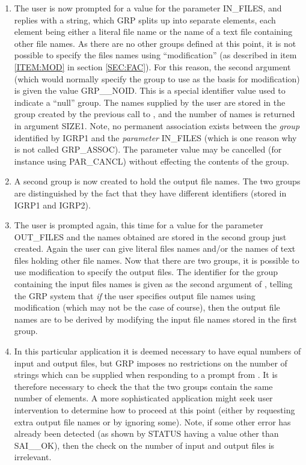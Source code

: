 \begin{enumerate}
\item The user is now prompted for a value for the parameter IN\_FILES, and
replies with a string, which GRP splits up into separate elements, each element
being either a literal file name or the name of a text file containing other
file names. As there are no other groups defined at this point, it is not
possible to specify the files names using ``modification'' (as described in item
\ref{ITEM:MOD} in section \ref{SEC:FAC}). For this reason, the second argument
(which would normally specify the group to use as the basis for modification) is
given the value GRP\_\_NOID. This is a special identifier value used to indicate
a ``null'' group. The names supplied by the user are stored in the group created
by the previous call to , and the number of names is returned in
argument SIZE1.
Note, no permanent association exists between the {\em group}
identified by IGRP1 and the {\em parameter} IN\_FILES (which is one reason why
 is not called GRP\_ASSOC). The parameter value may be cancelled (for
instance using PAR\_CANCL) without effecting the contents of the
group.

\item A second group is now created to hold the output file names. The two
groups are distinguished by the fact that they have different identifiers
(stored in IGRP1 and IGRP2).

\item \label {ITEM:OUT} The user is prompted again, this time for a value for
the parameter OUT\_FILES and the names obtained are stored in the second group
just created. Again the user can give literal files names and/or the names of
text files holding other file names. Now that there are two groups, it is
possible to use modification to specify the output files. The identifier for the
group containing the input files names is given as the second argument of
, telling the GRP system that {\em if} the user specifies output file
names using modification (which may not be the case of course), then the output
file names are to be derived by modifying the input file names stored in the
first group.

\item \label {ITEM:CHK} In this particular application it is deemed necessary to
have equal numbers of input and output files, but GRP imposes no restrictions on the
number of strings which can be supplied when responding to a prompt from
. It is therefore necessary to check the that the two groups contain
the same number of elements. A more sophisticated application might seek user
intervention to determine how to proceed at this point (either by requesting
extra output file names or by ignoring some). Note, if some other error has already been detected (as shown by
STATUS having a value other than SAI\_\_OK), then the check on the number of
input and output files is irrelevant.


\end{enumerate}

